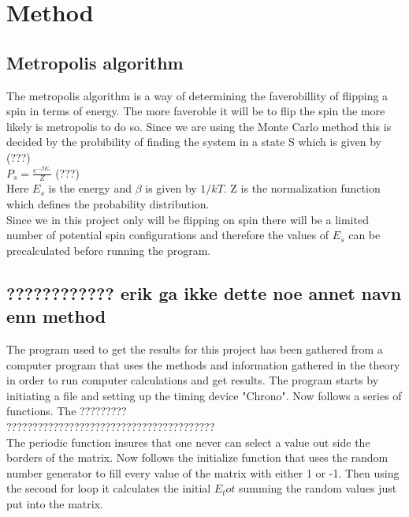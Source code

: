 \documentclass{article}
\begin{document}
\vspace{1cm}

\section{Method} \label{sec:Method}


\subsection{Metropolis algorithm}

The metropolis algorithm is a way of determining the faverobillity of flipping a spin in terms of energy. The more faveroble it will be to flip the spin the more likely is metropolis to do so. Since we are using the Monte Carlo method this is decided by the probibility of finding the system in a state S which is given by (???) \\

$P_s = \frac{e^{-\beta E_s}}{Z} $ (???) \\

Here $E_s$ is the energy and $\beta$ is given by $1/kT$. Z is the normalization function which defines the probability distribution. \\

Since we in this project only will be flipping on spin there will be a limited number of potential spin configurations and therefore the values of $E_s$ can be precalculated before running the program. \\


\subsection{???????????? erik ga ikke dette noe annet navn enn method}


The program used to get the results for this project has been gathered from a computer program that uses the methods and information gathered in the theory in order to run computer calculations and get results. The program starts by initiating a file and setting up the timing device "Chrono". Now follows a series of functions. The ????????? \\

????????????????????????????????????????\\

The periodic function insures that one never can select a value out side the borders of the matrix. Now follows the initialize function that uses the random number generator to fill every value of the matrix with either 1 or -1. Then using the second for loop it calculates the initial $E_tot$ summing the random values just put into the matrix. \\
\end{document}
